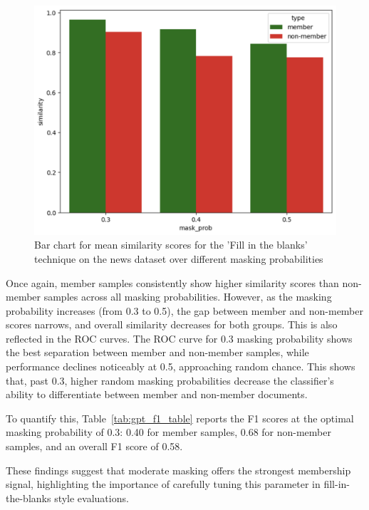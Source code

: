 \documentclass[sigconf]{acmart}
\begin{document}
\begin{figure}[htp]
  \centering
  \includegraphics[width=\columnwidth]{figures/news-mask-prob-bar.png}
    \caption{Bar chart for mean similarity scores for the 'Fill in the blanks' technique on the news dataset over different masking probabilities}
    \label{fig:news-mask-prob-bar}
\end{figure}

Once again, member samples consistently show higher similarity scores than non-member samples across all masking probabilities. However, as the masking probability increases (from 0.3 to 0.5), the gap between member and non-member scores narrows, and overall similarity decreases for both groups. This is also reflected in the ROC curves. The ROC curve for 0.3 masking probability shows the best separation between member and non-member samples, while performance declines noticeably at 0.5, approaching random chance. This shows that, past 0.3, higher random masking probabilities decrease the classifier's ability to differentiate between member and non-member documents.

To quantify this, Table~\ref{tab:gpt_f1_table} reports the F1 scores at the optimal masking probability of 0.3: 0.40 for member samples, 0.68 for non-member samples, and an overall F1 score of 0.58.


These findings suggest that moderate masking offers the strongest membership signal, highlighting the importance of carefully tuning this parameter in fill-in-the-blanks style evaluations.
\end{document}
